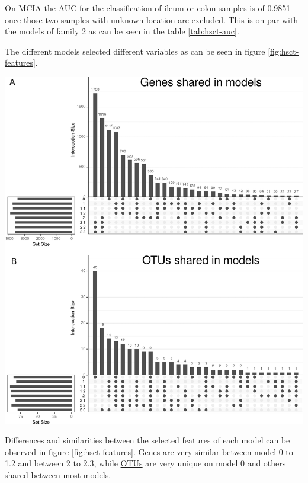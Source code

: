 \documentclass[
  12pt,
  a4paper,
  twoside,
  openright]{book}
\let\origfigure\figure
\let\endorigfigure\endfigure
\renewenvironment{figure}[1][2] {
    \expandafter\origfigure\expandafter[!htbp]
} {
    \endorigfigure
}
\begin{document}
On \protect\hyperlink{acronyms_MCIA}{MCIA} the \protect\hyperlink{acronyms_AUC}{AUC} for the classification of ileum or colon samples is of 0.9851 once those two samples with unknown location are excluded.
This is on par with the models of family 2 as can be seen in the table \ref{tab:hsct-auc}.

The different models selected different variables as can be seen in figure \ref{fig:hsct-features}.

\begin{figure}
\includegraphics[width=1\linewidth]{images/hsct-features} \caption[Upset plot of variables selected from the HSCT dataset.]{Upset plot of variables selected in the HSCT dataset. The variables selected on each model from 0 to 2.3 showing the intersection between them regarding genes, panel A, and OTUs, panel B. Genes are common on models of family 2, while OTUs are common on all models.}\label{fig:hsct-features}
\end{figure}

Differences and similarities between the selected features of each model can be observed in figure \ref{fig:hsct-features}.
Genes are very similar between model 0 to 1.2 and between 2 to 2.3, while \protect\hyperlink{acronyms_OTUs}{OTUs} are very unique on model 0 and others shared between most models.
\end{document}
